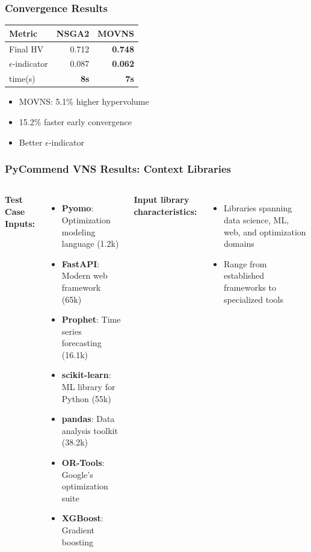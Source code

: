 \documentclass{beamer}
\begin{document}
\begin{frame}
\frametitle{Convergence Results}

\begin{center}
\begin{tabular}{lrr}
\toprule
\textbf{Metric} & \textbf{NSGA2} & \textbf{MOVNS} \\
\midrule
Final HV & 0.712 & \textbf{0.748} \\
$\epsilon$-indicator & 0.087 & \textbf{0.062} \\
time(s) & \textbf{ 8s }  & \textbf{ 7s }\\ 
\bottomrule
\end{tabular}
\end{center}
\vspace{0.5cm}
\begin{center}
\begin{itemize}
\item MOVNS: 5.1\% higher hypervolume
\item 15.2\% faster early convergence
\item Better $\epsilon$-indicator
\end{itemize}
\end{center}

\end{frame}



\begin{frame}
\frametitle{PyCommend VNS Results: Context Libraries}

\begin{columns}[T]
\textbf{Test Case Inputs:}
\begin{itemize}
\item \textbf{Pyomo}: Optimization modeling language (1.2k)
\item \textbf{FastAPI}: Modern web framework (65k)
\item \textbf{Prophet}: Time series forecasting (16.1k)
\item \textbf{scikit-learn}: ML library for Python (55k)
\item \textbf{pandas}: Data analysis toolkit (38.2k)
\item \textbf{OR-Tools}: Google's optimization suite 
\item \textbf{XGBoost}: Gradient boosting 
\end{itemize}

\vspace{0.1cm}
\textbf{Input library characteristics:}
\begin{itemize}
\item Libraries spanning data science, ML, web, and optimization domains
\item Range from established frameworks to specialized tools
\end{itemize}
\end{columns}
\end{frame}
\end{document}
